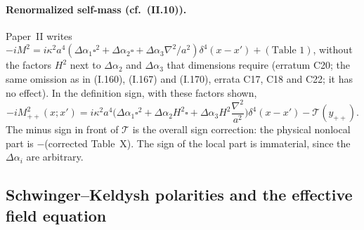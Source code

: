 \documentclass[aps,prd,onecolumn,10pt,nofootinbib,floatfix]{revtex4-2}
\newcommand{\PII}{Paper~II}
\newcommand{\eqI}[1]{(I.#1)}
\newcommand{\eqII}[1]{(II.#1)}
\newcommand{\Tab}{\mathcal{T}}
\begin{document}
\paragraph*{Renormalized self-mass (cf.\ \eqII{10}).}
\PII{} writes $-iM^2=i\kappa^2a^4(\Delta\alpha_1\square^2+\Delta\alpha_2\square+\Delta\alpha_3\nabla^2/a^2)\delta^4(x-x')
+(\text{Table 1})$, without the factors $H^2$ next to $\Delta\alpha_2$ and $\Delta\alpha_3$ that dimensions require
(erratum C20; the same omission as in \eqI{160}, \eqI{167} and \eqI{170}, errata C17, C18 and C22; it has no effect). In the definition sign, with these
factors shown,
\begin{equation}
-iM^2_{++}(x;x')=i\kappa^2a^4\Big(\Delta\alpha_1\square^2+\Delta\alpha_2H^2\square+\Delta\alpha_3H^2\frac{\nabla^2}{a^2}\Big)
\delta^4(x-x')-\Tab(y_{++}).
\label{eq:s6:Mpp}
\end{equation}
The minus sign in front of $\Tab$ is the overall sign correction: the physical nonlocal part is $-$(corrected Table~X).
The sign of the local part is immaterial, since the $\Delta\alpha_i$ are arbitrary.

\subsection{Schwinger--Keldysh polarities and the effective field equation}
\label{sec:s6:sk}
\end{document}

